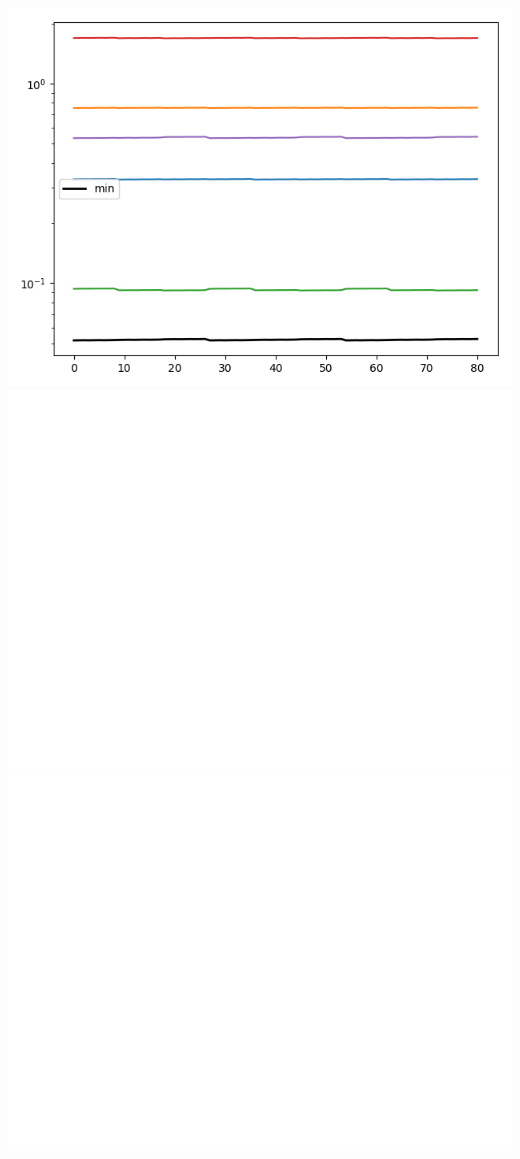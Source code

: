 \documentclass{article}
\begin{document}
\begin{center}
\includegraphics[scale=.9]{report_pickled_controls42/control_dpn_all}
\includegraphics[scale=.9]{control_fid_0}
\includegraphics[scale=.9]{off_diag_0}

\end{center}
\end{document}
